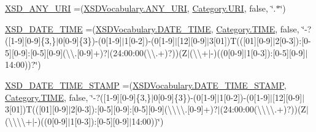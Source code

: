 \begin{DoxyCompactItemize}
\item 
\hyperlink{enumorg_1_1semanticweb_1_1owlapi_1_1vocab_1_1_o_w_l2_datatype_a49ae66845b26f51a964376de733a1027}{X\-S\-D\-\_\-\-A\-N\-Y\-\_\-\-U\-R\-I} =(\hyperlink{enumorg_1_1semanticweb_1_1owlapi_1_1vocab_1_1_x_s_d_vocabulary_a5e6b3364b1f99ef7ee561c4053c2b024}{X\-S\-D\-Vocabulary.\-A\-N\-Y\-\_\-\-U\-R\-I}, \hyperlink{enumorg_1_1semanticweb_1_1owlapi_1_1vocab_1_1_o_w_l2_datatype_1_1_category_a0b2cea4b5db3cac9d91806ba73db9125}{Category.\-U\-R\-I}, false, \char`\"{}.$\ast$\char`\"{})
\item 
\hyperlink{enumorg_1_1semanticweb_1_1owlapi_1_1vocab_1_1_o_w_l2_datatype_a73be4f362f3a3b502f4f0a35d5630ecb}{X\-S\-D\-\_\-\-D\-A\-T\-E\-\_\-\-T\-I\-M\-E} =(\hyperlink{enumorg_1_1semanticweb_1_1owlapi_1_1vocab_1_1_x_s_d_vocabulary_a6790413083cd12d777e8d7ef141eb387}{X\-S\-D\-Vocabulary.\-D\-A\-T\-E\-\_\-\-T\-I\-M\-E}, \hyperlink{enumorg_1_1semanticweb_1_1owlapi_1_1vocab_1_1_o_w_l2_datatype_1_1_category_ab744eaae59f144b9950cf5e14ff8e42e}{Category.\-T\-I\-M\-E}, false, \char`\"{}-\/?(\mbox{[}1-\/9\mbox{]}\mbox{[}0-\/9\mbox{]}\{3,\}$|$0\mbox{[}0-\/9\mbox{]}\{3\})-\/(0\mbox{[}1-\/9\mbox{]}$|$1\mbox{[}0-\/2\mbox{]})-\/(0\mbox{[}1-\/9\mbox{]}$|$\mbox{[}12\mbox{]}\mbox{[}0-\/9\mbox{]}$|$3\mbox{[}01\mbox{]})T((\mbox{[}01\mbox{]}\mbox{[}0-\/9\mbox{]}$|$2\mbox{[}0-\/3\mbox{]})\-:\mbox{[}0-\/5\mbox{]}\mbox{[}0-\/9\mbox{]}\-:\mbox{[}0-\/5\mbox{]}\mbox{[}0-\/9\mbox{]}(\textbackslash{}\textbackslash{}.\mbox{[}0-\/9\mbox{]}+)?$|$(24\-:00\-:00(\textbackslash{}\textbackslash{}.+)?))(Z$|$(\textbackslash{}\textbackslash{}+$|$-\/)((0\mbox{[}0-\/9\mbox{]}$|$1\mbox{[}0-\/3\mbox{]})\-:\mbox{[}0-\/5\mbox{]}\mbox{[}0-\/9\mbox{]}$|$14\-:00))?\char`\"{})
\item 
\hyperlink{enumorg_1_1semanticweb_1_1owlapi_1_1vocab_1_1_o_w_l2_datatype_ada5811e8b1e61f35fbf3c253e7aadbd3}{X\-S\-D\-\_\-\-D\-A\-T\-E\-\_\-\-T\-I\-M\-E\-\_\-\-S\-T\-A\-M\-P} =(\hyperlink{enumorg_1_1semanticweb_1_1owlapi_1_1vocab_1_1_x_s_d_vocabulary_a9f62a44a73b23a90763879f9abe627a4}{X\-S\-D\-Vocabulary.\-D\-A\-T\-E\-\_\-\-T\-I\-M\-E\-\_\-\-S\-T\-A\-M\-P}, \hyperlink{enumorg_1_1semanticweb_1_1owlapi_1_1vocab_1_1_o_w_l2_datatype_1_1_category_ab744eaae59f144b9950cf5e14ff8e42e}{Category.\-T\-I\-M\-E}, false, \char`\"{}-\/?(\mbox{[}1-\/9\mbox{]}\mbox{[}0-\/9\mbox{]}\{3,\}$|$0\mbox{[}0-\/9\mbox{]}\{3\})-\/(0\mbox{[}1-\/9\mbox{]}$|$1\mbox{[}0-\/2\mbox{]})-\/(0\mbox{[}1-\/9\mbox{]}$|$\mbox{[}12\mbox{]}\mbox{[}0-\/9\mbox{]}$|$3\mbox{[}01\mbox{]})T((\mbox{[}01\mbox{]}\mbox{[}0-\/9\mbox{]}$|$2\mbox{[}0-\/3\mbox{]})\-:\mbox{[}0-\/5\mbox{]}\mbox{[}0-\/9\mbox{]}\-:\mbox{[}0-\/5\mbox{]}\mbox{[}0-\/9\mbox{]}(\textbackslash{}\textbackslash{}\textbackslash{}\textbackslash{}.\mbox{[}0-\/9\mbox{]}+)?$|$(24\-:00\-:00(\textbackslash{}\textbackslash{}\textbackslash{}\textbackslash{}.+)?))(Z$|$(\textbackslash{}\textbackslash{}\textbackslash{}\textbackslash{}+$|$-\/)((0\mbox{[}0-\/9\mbox{]}$|$1\mbox{[}0-\/3\mbox{]})\-:\mbox{[}0-\/5\mbox{]}\mbox{[}0-\/9\mbox{]}$|$14\-:00))\char`\"{})
\end{DoxyCompactItemize}
